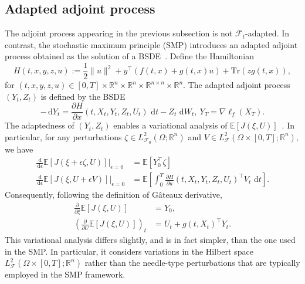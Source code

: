 \documentclass[letterpaper, 10 pt, conference]{ieeeconf}  %
\def\Re{\mathbb{R}}
\def\R{\mathbb{R}}
\newcommand{\field}[1]{\mathbb{#1}}
\def\Re{\field{R}}
\def\Expect{{\mathbb E}}
\def\R{\mathbb{R}}
\newcommand{\trace}{\text{Tr}}
\newcommand{\ud}{\,\mathrm{d}}
\def\Re{\mathbb{R}}
\renewcommand{\Re}{\mathbb{R}}
\newcommand{\F}{{\mathcal F}}
\begin{document}
\subsection{Adapted adjoint process}
The adjoint process appearing in the previous subsection is not $\mathcal F_t$-adapted.  
In contrast, the stochastic maximum principle (SMP) introduces an adapted adjoint process obtained as the solution of a BSDE~\cite{yong1999stochastic}. 
Define the Hamiltonian
\begin{equation}
    H(t, x, y, z,u) := \frac{1}{2}\|u\|^2 + y^\top (f(t,x) + g(t,x)u) +  \trace(z g(t,x)),
\end{equation}
for $(t,x,y,z,u) \in [0,T]\times \R^n \times \R^n \times \R^{n\times n} \times \R^n$. The adapted adjoint process $(Y_t,Z_t)$ is defined by the BSDE
\begin{equation}
-\ud Y_t
=
\frac{\partial H}{\partial x}(t,X_t,Y_t,Z_t,U_t)\,\ud t
-
Z_t\,\ud W_t,~
Y_T
=
\nabla \ell_f(X_T).
\label{eq:bsde}
\end{equation}
The adaptedness of $(Y_t,Z_t)$ enables a variational analysis of $\Expect[J(\xi,U)]$~\cite[Sec. 4.3]{yong1999stochastic}. In particular, for any perturbations $\zeta \in L^2_{\F_0}(\Omega;\Re^n
)$ and $V \in L^2_{\F}(\Omega\times [0,T];\Re^n
)$, we have
\begin{align*}
\frac{\ud}{\ud \epsilon}
\mathbb E[J(\xi+\epsilon\zeta,U)]
\Big|_{\epsilon=0}
&=
\mathbb E[Y_0^\top\zeta] \\ 
\frac{\ud}{\ud \epsilon}
\mathbb E[J(\xi,U+\epsilon V)]
\Big|_{\epsilon=0}  &= 
\mathbb E\!\left[
\int_0^T
\frac{\partial H}{\partial u}
(t,X_t,Y_t,Z_t,U_t)^\top V_t
\,\ud t
\right].
\end{align*} 
Consequently, following the definition of G\^ateaux derivative, 
\begin{align*}
\frac{\partial}{\partial \xi}\mathbb E[J(\xi,U)]
&=
Y_0,
\\
\left(\frac{\partial}{\partial U}\mathbb E[J(\xi,U)]\right)_t
&=
U_t + g(t,X_t)^\top Y_t .
\end{align*}
This variational analysis differs slightly, and is in fact simpler, than the one used in the SMP. In particular, it considers variations in the Hilbert space $L^2_{\mathcal F}(\Omega \times [0,T];\Re^n)$ rather than the needle-type perturbations that are typically employed in the SMP framework. 
\end{document}
